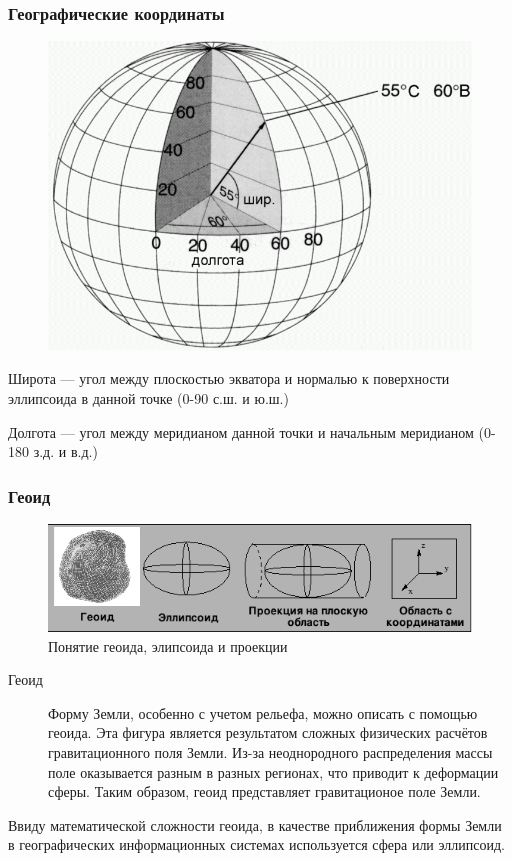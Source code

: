 \begin{frame}
    \frametitle{Географические координаты}
    \begin{figure}[!ht]
        \begin{center}
            \includegraphics[width=0.6\columnwidth]{./coordinates/img/geo_coord}
        \end{center}
    \end{figure}

    Широта --- угол между  плоскостью экватора и нормалью к поверхности эллипсоида в данной точке (0-90 с.ш. и ю.ш.)

    Долгота --- угол между меридианом данной точки и начальным меридианом (0-180 з.д. и в.д.)
\end{frame}



\begin{frame}
    \frametitle{Геоид}
    \begin{figure}[!ht]
        \begin{center}
            \includegraphics[width=0.7\columnwidth]{./coordinates/img/geoid.png}
        \end{center}
        \caption{Понятие геоида, элипсоида и проекции}
    \end{figure}
    \begin{description}
        \item[Геоид] Форму Земли, особенно с учетом рельефа, можно описать с помощью геоида. Эта фигура является результатом сложных физических расчётов гравитационного поля Земли. Из-за неоднородного распределения массы поле оказывается разным в разных регионах, что приводит к деформации сферы. Таким образом, геоид представляет гравитационое поле Земли.
    \end{description}
    Ввиду математической сложности геоида, в качестве приближения формы Земли в географических информационных системах используется сфера или эллипсоид.
\end{frame}

